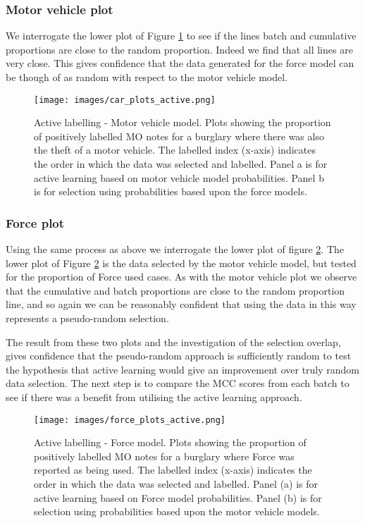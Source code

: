 \subsubsection{Motor vehicle plot}We interrogate the lower plot of Figure \ref{fig:active_car} to see if the lines batch and cumulative proportions are close to the random proportion. Indeed we find that all lines are very close. This gives confidence that the data generated for the force model can be though of as random with respect to the motor vehicle model. 

\begin{figure}[!ht]
  \centering
    \texttt{[image: images/car\_plots\_active.png]}
    \caption{{Active labelling - Motor vehicle model.} Plots showing the proportion of positively labelled MO notes for a burglary where there was also the theft of a motor vehicle. The labelled index (x-axis) indicates the order in which the data was selected and labelled. Panel a is for active learning based on motor vehicle model probabilities. Panel b is for selection using probabilities based upon the force models.}
    \label{fig:active_car}
\end{figure}


\subsubsection{Force plot} Using the same process as above we interrogate the lower plot of figure \ref{fig:active_force}. The lower plot of Figure \ref{fig:active_force} is the data selected by the motor vehicle model, but tested for the proportion of Force used cases. As with the motor vehicle plot we observe that the cumulative and batch proportions are close to the random proportion line, and so again we can be reasonably confident that using the data in this way represents a pseudo-random selection.

The result from these two plots and the investigation of the selection overlap, gives confidence that the pseudo-random approach is sufficiently random to test the hypothesis that active learning would give an improvement over truly random data selection. The next step is to compare the MCC scores from each batch to see if there was a benefit from utilising the active learning approach.



\begin{figure}[!ht]
  \centering
    \texttt{[image: images/force\_plots\_active.png]}
    \caption{{Active labelling - Force model.} Plots showing the proportion of positively labelled MO notes for a burglary where Force was reported as being used. The labelled index (x-axis) indicates the order in which the data was selected and labelled. Panel (a) is for active learning based on Force model probabilities. Panel (b) is for selection using probabilities based upon the motor vehicle models.}
    \label{fig:active_force}
\end{figure}


